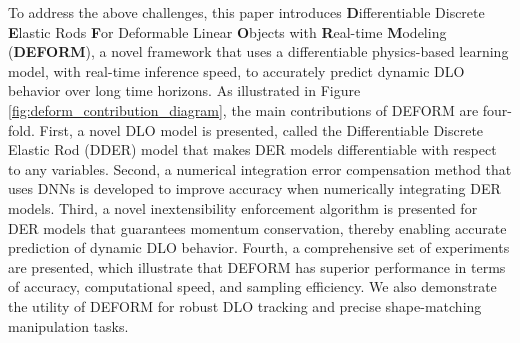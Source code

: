 To address the above challenges, this paper introduces \textbf{D}ifferentiable Discrete \textbf{E}lastic Rods \textbf{F}or Deformable Linear \textbf{O}bjects with \textbf{R}eal-time \textbf{M}odeling (\textbf{DEFORM}), a novel framework that uses a differentiable physics-based learning model, with real-time inference speed, to accurately predict dynamic DLO behavior over long time horizons.
As illustrated in Figure \ref{fig:deform_contribution_diagram}, the main contributions of DEFORM are four-fold.
First, a novel DLO model is presented, called the Differentiable Discrete Elastic Rod (DDER) model that makes DER models differentiable with respect to any variables.
Second, a numerical integration error compensation method that uses DNNs is developed to improve accuracy when numerically integrating DER models.
Third, a novel inextensibility enforcement algorithm is presented for DER models that guarantees momentum conservation, thereby enabling accurate prediction of dynamic DLO behavior.
Fourth, a comprehensive set of experiments are presented, which illustrate that DEFORM has superior performance in terms of accuracy, computational speed, and sampling efficiency. 
We also demonstrate the utility of DEFORM for robust DLO tracking and precise shape-matching manipulation tasks.

